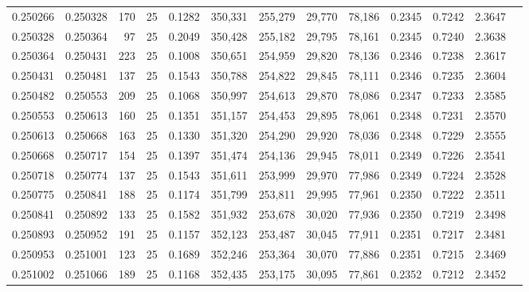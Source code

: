 \begin{tabular}{rrrrrrrrrrrrr}
0.250266 & 0.250328 &   170 &  25 &                                     0.1282 & 350,331 & 255,279 &  29,770 &  78,186 & 0.2345 & 0.7242 & 2.3647 \\
0.250328 & 0.250364 &    97 &  25 &                                     0.2049 & 350,428 & 255,182 &  29,795 &  78,161 & 0.2345 & 0.7240 & 2.3638 \\
0.250364 & 0.250431 &   223 &  25 &                                     0.1008 & 350,651 & 254,959 &  29,820 &  78,136 & 0.2346 & 0.7238 & 2.3617 \\
0.250431 & 0.250481 &   137 &  25 &                                     0.1543 & 350,788 & 254,822 &  29,845 &  78,111 & 0.2346 & 0.7235 & 2.3604 \\
0.250482 & 0.250553 &   209 &  25 &                                     0.1068 & 350,997 & 254,613 &  29,870 &  78,086 & 0.2347 & 0.7233 & 2.3585 \\
0.250553 & 0.250613 &   160 &  25 &                                     0.1351 & 351,157 & 254,453 &  29,895 &  78,061 & 0.2348 & 0.7231 & 2.3570 \\
0.250613 & 0.250668 &   163 &  25 &                                     0.1330 & 351,320 & 254,290 &  29,920 &  78,036 & 0.2348 & 0.7229 & 2.3555 \\
0.250668 & 0.250717 &   154 &  25 &                                     0.1397 & 351,474 & 254,136 &  29,945 &  78,011 & 0.2349 & 0.7226 & 2.3541 \\
0.250718 & 0.250774 &   137 &  25 &                                     0.1543 & 351,611 & 253,999 &  29,970 &  77,986 & 0.2349 & 0.7224 & 2.3528 \\
0.250775 & 0.250841 &   188 &  25 &                                     0.1174 & 351,799 & 253,811 &  29,995 &  77,961 & 0.2350 & 0.7222 & 2.3511 \\
0.250841 & 0.250892 &   133 &  25 &                                     0.1582 & 351,932 & 253,678 &  30,020 &  77,936 & 0.2350 & 0.7219 & 2.3498 \\
0.250893 & 0.250952 &   191 &  25 &                                     0.1157 & 352,123 & 253,487 &  30,045 &  77,911 & 0.2351 & 0.7217 & 2.3481 \\
0.250953 & 0.251001 &   123 &  25 &                                     0.1689 & 352,246 & 253,364 &  30,070 &  77,886 & 0.2351 & 0.7215 & 2.3469 \\
0.251002 & 0.251066 &   189 &  25 &                                     0.1168 & 352,435 & 253,175 &  30,095 &  77,861 & 0.2352 & 0.7212 & 2.3452 \\

\end{tabular}
